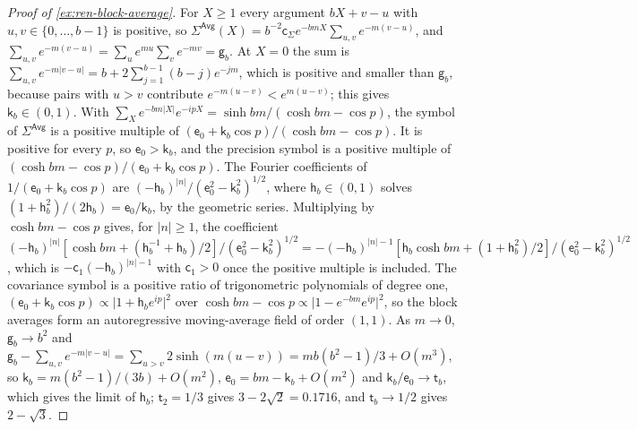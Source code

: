 \begin{proof}[Proof of \cref{ex:ren-block-average}]
For $X\ge1$ every argument $bX+v-u$ with $u,v\in\{0,\dots,b-1\}$ is positive, so $\Sigma^{\mathsf{Avg}}(X)=b^{-2}\mathsf c_\Sigma e^{-bmX}\sum_{u,v}e^{-m(v-u)}$, and $\sum_{u,v}e^{-m(v-u)}=\sum_ue^{mu}\sum_ve^{-mv}=\mathsf g_b$. At $X=0$ the sum is $\sum_{u,v}e^{-m\lvert v-u\rvert}=b+2\sum_{j=1}^{b-1}(b-j)e^{-jm}$, which is positive and smaller than $\mathsf g_b$, because pairs with $u>v$ contribute $e^{-m(u-v)}<e^{m(u-v)}$; this gives $\mathsf k_b\in(0,1)$. With $\sum_Xe^{-bm\lvert X\rvert}e^{-ipX}=\sinh bm/(\cosh bm-\cos p)$, the symbol of $\Sigma^{\mathsf{Avg}}$ is a positive multiple of $(\mathsf e_0+\mathsf k_b\cos p)/(\cosh bm-\cos p)$. It is positive for every $p$, so $\mathsf e_0>\mathsf k_b$, and the precision symbol is a positive multiple of $(\cosh bm-\cos p)/(\mathsf e_0+\mathsf k_b\cos p)$. The Fourier coefficients of $1/(\mathsf e_0+\mathsf k_b\cos p)$ are $(-\mathsf h_b)^{\lvert n\rvert}/(\mathsf e_0^2-\mathsf k_b^2)^{1/2}$, where $\mathsf h_b\in(0,1)$ solves $(1+\mathsf h_b^2)/(2\mathsf h_b)=\mathsf e_0/\mathsf k_b$, by the geometric series. Multiplying by $\cosh bm-\cos p$ gives, for $\lvert n\rvert\ge1$, the coefficient $(-\mathsf h_b)^{\lvert n\rvert}[\cosh bm+(\mathsf h_b^{-1}+\mathsf h_b)/2]/(\mathsf e_0^2-\mathsf k_b^2)^{1/2}=-(-\mathsf h_b)^{\lvert n\rvert-1}[\mathsf h_b\cosh bm+(1+\mathsf h_b^2)/2]/(\mathsf e_0^2-\mathsf k_b^2)^{1/2}$, which is $-\mathsf c_1(-\mathsf h_b)^{\lvert n\rvert-1}$ with $\mathsf c_1>0$ once the positive multiple is included. The covariance symbol is a positive ratio of trigonometric polynomials of degree one, $(\mathsf e_0+\mathsf k_b\cos p)\propto\lvert1+\mathsf h_be^{ip}\rvert^2$ over $\cosh bm-\cos p\propto\lvert1-e^{-bm}e^{ip}\rvert^2$, so the block averages form an autoregressive moving-average field of order $(1,1)$. As $m\to0$, $\mathsf g_b\to b^2$ and $\mathsf g_b-\sum_{u,v}e^{-m\lvert v-u\rvert}=\sum_{u>v}2\sinh(m(u-v))=mb(b^2-1)/3+O(m^3)$, so $\mathsf k_b=m(b^2-1)/(3b)+O(m^2)$, $\mathsf e_0=bm-\mathsf k_b+O(m^2)$ and $\mathsf k_b/\mathsf e_0\to\mathsf t_b$, which gives the limit of $\mathsf h_b$; $\mathsf t_2=1/3$ gives $3-2\sqrt2=0.1716$, and $\mathsf t_b\to1/2$ gives $2-\sqrt3$.
\end{proof}

